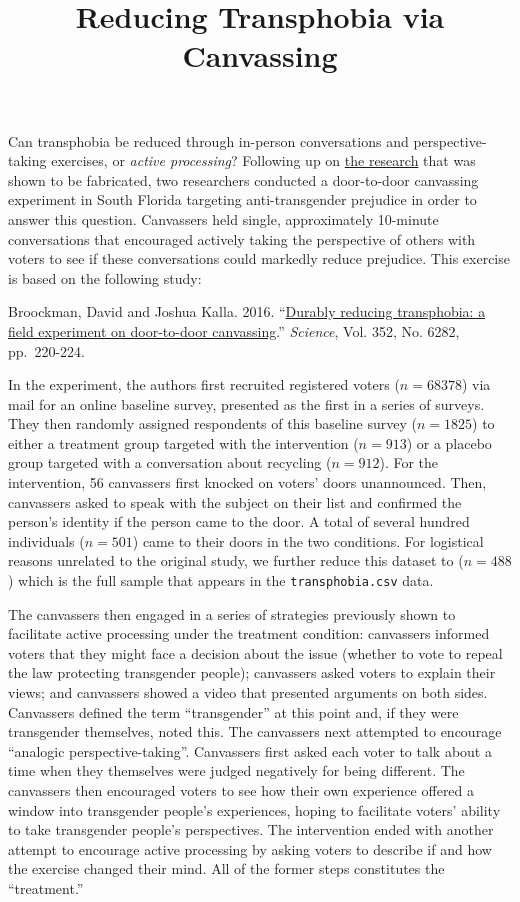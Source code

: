 \documentclass[]{article}
\title{Reducing Transphobia via Canvassing}
\author{}
\date{}
\begin{document}
\maketitle


Can transphobia be reduced through in-person conversations and
perspective-taking exercises, or \emph{active processing}? Following up
on \href{http://dx.doi.org/10.1126/science.1256151}{the research} that
was shown to be fabricated, two researchers conducted a door-to-door
canvassing experiment in South Florida targeting anti-transgender
prejudice in order to answer this question. Canvassers held single,
approximately 10-minute conversations that encouraged actively taking
the perspective of others with voters to see if these conversations
could markedly reduce prejudice. This exercise is based on the following
study:

Broockman, David and Joshua Kalla. 2016.
``\href{https://dx.doi.org/10.1126/science.aad9713}{Durably reducing
transphobia: a field experiment on door-to-door canvassing}.''
\emph{Science}, Vol. 352, No. 6282, pp.~220-224.

In the experiment, the authors first recruited registered voters
($n=68378$) via mail for an online baseline survey, presented as the
first in a series of surveys. They then randomly assigned respondents of
this baseline survey ($n=1825$) to either a treatment group targeted
with the intervention ($n=913$) or a placebo group targeted with a
conversation about recycling ($n=912$). For the intervention, 56
canvassers first knocked on voters' doors unannounced. Then, canvassers
asked to speak with the subject on their list and confirmed the person's
identity if the person came to the door. A total of several hundred
individuals ($n=501$) came to their doors in the two conditions. For
logistical reasons unrelated to the original study, we further reduce
this dataset to ($n=488$) which is the full sample that appears in the
\texttt{transphobia.csv} data.

The canvassers then engaged in a series of strategies previously shown
to facilitate active processing under the treatment condition:
canvassers informed voters that they might face a decision about the
issue (whether to vote to repeal the law protecting transgender people);
canvassers asked voters to explain their views; and canvassers showed a
video that presented arguments on both sides. Canvassers defined the
term ``transgender'' at this point and, if they were transgender
themselves, noted this. The canvassers next attempted to encourage
``analogic perspective-taking''. Canvassers first asked each voter to
talk about a time when they themselves were judged negatively for being
different. The canvassers then encouraged voters to see how their own
experience offered a window into transgender people's experiences,
hoping to facilitate voters' ability to take transgender people's
perspectives. The intervention ended with another attempt to encourage
active processing by asking voters to describe if and how the exercise
changed their mind. All of the former steps constitutes the
``treatment.''
\end{document}
